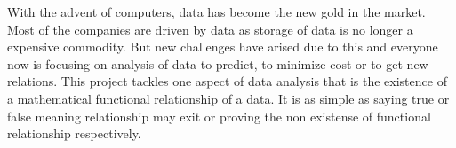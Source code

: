 With the advent of computers, data has become the new gold in the market. Most of the companies are driven by data as storage of data is no longer a expensive commodity. But new challenges have arised due to this and everyone now is focusing on analysis of data to predict, to minimize cost or to get new relations. This project tackles one aspect of data analysis that is the existence of a mathematical functional relationship of a data. It is as simple as saying true or false meaning relationship may exit or proving the non existense of functional relationship respectively.